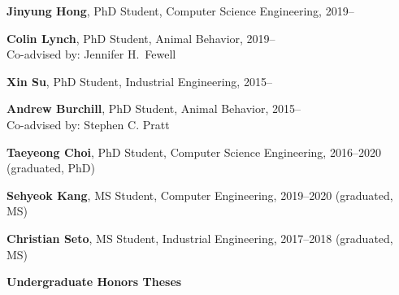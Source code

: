 \documentclass[10pt]{article}           %
\newcommand{\blankline}{\quad\pagebreak[3]}
\begin{document}
\begin{outerlist}

    \item \textbf{Jinyung Hong}, PhD Student, Computer Science
        Engineering, 2019--

    \item \textbf{Colin Lynch}, PhD Student, Animal Behavior, 2019--\\
        Co-advised by: Jennifer H.~Fewell


    \item \textbf{Xin Su}, PhD Student, Industrial Engineering, 2015--

    \item \textbf{Andrew Burchill}, PhD Student, Animal Behavior, 2015--\\
        Co-advised by: Stephen C. Pratt

    \item \textbf{Taeyeong Choi}, PhD Student, Computer Science Engineering, 2016--2020 (graduated, PhD)

    \item \textbf{Sehyeok Kang}, MS Student, Computer Engineering, 2019--2020 (graduated, MS)

    \item \textbf{Christian Seto}, MS Student, Industrial Engineering, 2017--2018 (graduated, MS)
\end{outerlist}

\blankline

\textbf{Undergraduate Honors Theses}
\end{document}
